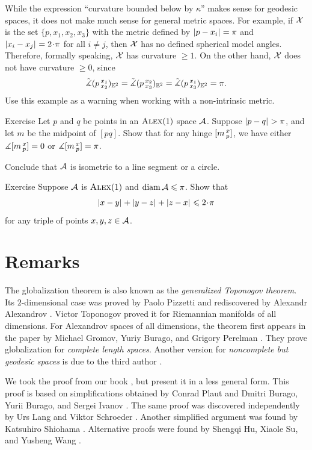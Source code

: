 While the expression ``curvature bounded below by $\kappa$'' makes sense for geodesic spaces,
it does not make much sense for general metric spaces.
For example, if $\mathcal{X}$ is the set $\{p,x_1,x_2,x_3\}$ with the metric defined by
$\dist{p}{x_i}{}=\pi$ and $\dist{x_i}{x_j}{}=2\cdot\pi$ for all $i\ne j$, then $\mathcal{X}$ has no defined spherical model angles.
Therefore, formally speaking, $\mathcal{X}$ has curvature $\ge 1$.
On the other hand, $\mathcal{X}$ does not have curvature $\ge 0$, since
\[
\tilde\measuredangle(p\,{}^{x_1}_{x_2})_{\mathbb{E}^2}
=\tilde\measuredangle(p\,{}^{x_2}_{x_3})_{\mathbb{E}^2}
=\tilde\measuredangle(p\,{}^{x_1}_{x_3})_{\mathbb{E}^2}
=\pi.
\]
Use this example as a warning when working with a non-intrinsic metric.

\begin{thm}[!]{Exercise}\label{ex:RisCBB(1)}
Let $p$ and $q$ be points in an $\textup{\textsc{Alex}}(1)$ space $\mathcal{A}$.
Suppose $\dist{p}{q}{}>\pi$, and let $m$ be the midpoint of $[pq]$.
Show that for any hinge $[m\,{}^{x}_{p}]$, we have either
$\measuredangle[m\,{}^{x}_{p}]=0$ or $\measuredangle[m\,{}^{x}_{p}]=\pi$.

Conclude that $\mathcal{A}$ is isometric to a line segment or a circle.
\end{thm}

\begin{thm}{Exercise}\label{ex:perim-k>0}
Suppose
$\mathcal{A}$ is $\textup{\textsc{Alex}}(1)$
and $\operatorname{\rm diam}\nolimits \mathcal{A}\leqslant \pi$.
Show that 
\[\dist{x}{y}{}+\dist{y}{z}{}+\dist{z}{x}{}\le 2\cdot\pi\]
for any triple of points $x,y,z\in \mathcal{A}$.
\end{thm}

\section{Remarks}

The globalization theorem is also known as the \textit{generalized Toponogov theorem}.
Its $2$-dimensional case was proved by Paolo Pizzetti \cite{pizzetti} and
rediscovered by Alexandr Alexandrov \cite{alexandrov:devel}.
Victor Toponogov \cite{toponogov-globalization+splitting} proved it for Riemannian manifolds of all dimensions.
For Alexandrov spaces of all dimensions, the theorem first appears in the paper by Michael Gromov, Yuriy Burago, and Grigory Perelman \cite{burago-gromov-perelman}.
They prove globalization for \textit{complete length spaces}.
Another version for \textit{noncomplete but geodesic spaces} is due to the third author \cite{petrunin:globalization}.

We took the proof from our book \cite{alexander-kapovitch-petrunin2024}, but present it in a less general form.
This proof is based on simplifications obtained by Conrad Plaut \cite{plaut:dimension} and Dmitri Burago, Yurii Burago, and Sergei Ivanov \cite{burago-burago-ivanov}.
The same proof was discovered independently by Urs Lang and Viktor Schroeder \cite{lang-schroeder:globalization}.
Another simplified argument was found by Katsuhiro Shiohama \cite{shiohama}.
Alternative proofs were found by Shengqi Hu, Xiaole Su, and Yusheng Wang \cite{hu-su-wang2023,hu-su-wang2024}.
